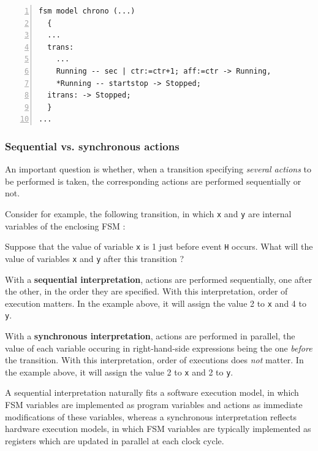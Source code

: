 \begin{lstlisting}[language=Rfsm,frame=single,numbers=left,caption=A rewriting of the model defined
  in Listing~\ref{lst:rfsm-prio-pb}, label={lst:rfsm-prio-solved},float]
fsm model chrono (...)
  {
  ...
  trans:
    ...
    Running -- sec | ctr:=ctr+1; aff:=ctr -> Running,
    *Running -- startstop -> Stopped;
  itrans: -> Stopped;
  }
...
\end{lstlisting}

\subsubsection{Sequential vs. synchronous actions}
\label{sec:sequ-vs.-synchr}

An important question is whether, when a transition specifying \emph{several actions} to be
performed is taken, the corresponding actions are performed sequentially or not. 

Consider for example, the following transition, in which \verb|x| and \verb|y| are internal
variables of the enclosing FSM :

\begin{center}
\end{center}

Suppose that the value of variable \verb|x| is 1 just before event \verb|H| occurs. What will the value of
variables \verb|x| and \verb|y| after this transition ?

\step With a \textbf{sequential interpretation}, actions are performed sequentially, one after the
other, in the order they are specified. With this interpretation, order of execution matters. In the example above, it will
assign the value 2 to \verb|x| and 4 to \verb|y|.

\step With a \textbf{synchronous interpretation}, actions are performed in parallel, the value of each variable
occuring in right-hand-side expressions being the one \emph{before} the transition. With this
interpretation, order of executions does \emph{not} matter. In the example above, it will
assign the value 2 to \verb|x| and 2 to \verb|y|.

\medskip
A sequential interpretation naturally fits a software execution model, in which FSM variables are
implemented as program variables and actions as immediate modifications of these variables, whereas
a synchronous interpretation reflects hardware execution models, in which FSM variables are
typically implemented as registers which are updated in parallel at each clock cycle.

